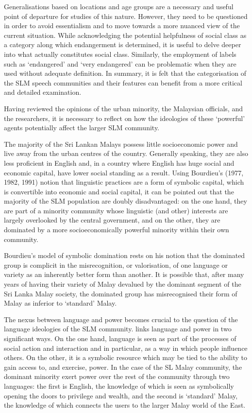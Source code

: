 Generalisations based on locations and age groups are a necessary and useful point of departure for studies of this nature. However, they need to be questioned in order to avoid essentialism and to move towards a more nuanced view of the current situation.  While acknowledging the potential helpfulness of social class as a category along which endangerment is determined, it is useful to delve deeper into what actually constitutes social class. Similarly, the employment of labels such as `endangered' and `very endangered' can be problematic when they are used without adequate definition. In summary, it is felt that the categorisation of the SLM speech communities and their features can benefit from a more critical and detailed examination. 

Having reviewed the opinions of the urban minority, the Malaysian officials, and the researchers, it is necessary to reflect on how the ideologies of these `powerful' agents potentially affect the larger SLM community. 

The majority of the Sri Lankan Malays possess little socioeconomic power and live away from the urban centres of the country. Generally speaking, they are also less proficient in English and, in a country where English has huge social and economic capital, have lower social standing as a result. Using Bourdieu's (1977, 1982, 1991) \nocite{Bourdieu1977,Bourdieu1982,Bourdieu1991} notion that linguistic practices are a form of symbolic capital, which is convertible into economic and social capital, it can be pointed out that the majority of the SLM population are doubly disadvantaged: on the one hand, they are part of a minority community whose linguistic (and other) interests are largely overlooked by the central government, and on the other, they are dominated by a more socioeconomically powerful minority within their own community.

Bourdieu's model of symbolic domination rests on his notion that the dominated group is complicit in the misrecognition, or valorisation, of one language or variety as an inherently better form than another. It is possible that, after many years of having their variety of Malay devalued by the dominant segment of the Sri Lanka Malay society, the dominated group has misrecognised their form of Malay as inferior to `standard' Malay. 

The nexus between language and power becomes crucial to the question of the language ideologies of the SLM community. \citet{Heller1982} links language and power in two significant ways. On the one hand, language is seen as part of the processes of social action and interaction and in particular, as a way in which people influence others. On the other, it is a symbolic resource which may be tied to the ability to gain access to, and exercise, power. In the case of the SL Malay community, the dominant minority exert power over the rest of the community through two languages: the first is English, the knowledge of which is seen as symbolically opening the doors to privilege and wealth, and the second is `standard' Malay, the knowledge of which connects the users to the larger Malay world of the East. 

